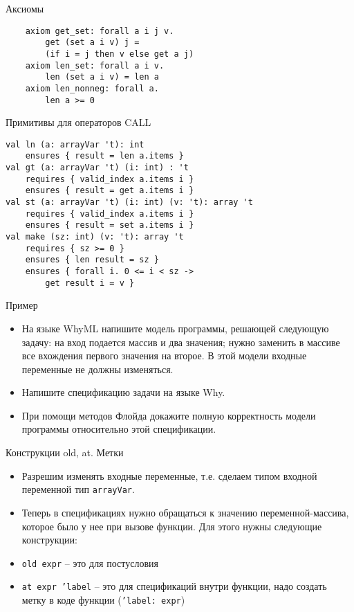 \documentclass[hyperref={unicode=true}]{beamer}
\begin{document}
    \begin{frame}[fragile]{Аксиомы}
    \begin{lstlisting}
    axiom get_set: forall a i j v.
        get (set a i v) j =
        (if i = j then v else get a j)
    axiom len_set: forall a i v.
        len (set a i v) = len a
    axiom len_nonneg: forall a.
        len a >= 0
    \end{lstlisting}
    \end{frame}

    \begin{frame}[fragile]{Примитивы для операторов CALL}
    \begin{lstlisting}
val ln (a: arrayVar 't): int
    ensures { result = len a.items }
val gt (a: arrayVar 't) (i: int) : 't
    requires { valid_index a.items i }
    ensures { result = get a.items i }
val st (a: arrayVar 't) (i: int) (v: 't): array 't
    requires { valid_index a.items i }
    ensures { result = set a.items i }
val make (sz: int) (v: 't): array 't
    requires { sz >= 0 }
    ensures { len result = sz }
    ensures { forall i. 0 <= i < sz ->
        get result i = v }
    \end{lstlisting}
    \end{frame}

    \begin{frame}{Пример}
    \begin{itemize}
    \item
    На языке WhyML напишите модель программы,
    решающей следующую задачу: на вход подается
    массив и два значения; нужно заменить в массиве все
    вхождения первого значения на второе.
    В этой модели входные переменные не должны
    изменяться.
    \item
    Напишите спецификацию задачи на языке Why.
    \item
    При помощи методов Флойда докажите полную
    корректность модели программы относительно
    этой спецификации.
    \end{itemize}
    \end{frame}

    \begin{frame}{Конструкции old, at. Метки}
    \begin{itemize}
    \item
    Разрешим изменять входные переменные, т.е.
    сделаем типом входной переменной тип \texttt{arrayVar}.
    \item
    Теперь в спецификациях нужно обращаться
    к значению переменной-массива, которое было
    у нее при вызове функции. Для этого нужны следующие конструкции:
    \item
    \texttt{old expr} -- это для постусловия
    \item
    \texttt{at expr 'label} -- это для спецификаций внутри функции,
    надо создать метку в коде функции (\texttt{'label: expr})
    \end{itemize}
    \end{frame}
\end{document}
